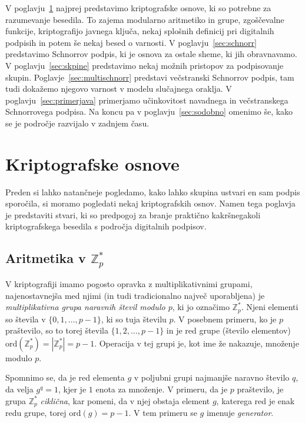 \documentclass[isrm2, tisk]{fmfdelo}
\newcommand{\Z}{\mathbb Z}
\begin{document}
V poglavju~\ref{sec:osnove} najprej predstavimo kriptografske osnove, ki so potrebne za razumevanje besedila.
To zajema modularno aritmetiko in grupe, zgoščevalne funkcije, kriptografijo javnega ključa, nekaj
splošnih definicij pri digitalnih podpisih in potem še nekaj besed o varnosti. V poglavju~\ref{sec:schnorr}
predstavimo Schnorrov podpis, ki je osnova za ostale sheme, ki jih obravnavamo. V 
poglavju~\ref{sec:skpine} predstavimo nekaj možnih pristopov za podpisovanje skupin. Poglavje~\ref{sec:multischnorr}
predstavi večstranski Schnorrov podpis, tam tudi dokažemo njegovo varnost v modelu slučajnega oraklja.
V poglavju~\ref{sec:primerjava} primerjamo učinkovitost navadnega in večstranskega Schnorrovega podpisa.
Na koncu pa v poglavju~\ref{sec:sodobno} omenimo še, kako se je področje razvijalo v zadnjem času.

\section{Kriptografske osnove}
\label{sec:osnove}
Preden si lahko natančneje pogledamo, kako lahko skupina ustvari en sam podpis sporočila, si moramo 
pogledati nekaj kriptografskih osnov. Namen tega poglavja je predstaviti stvari, ki so predpogoj za
branje praktično kakršnegakoli kriptografskega besedila s področja digitalnih podpisov.

\subsection{Aritmetika v \texorpdfstring{$\Z_p^*$}{Zp∗}}
V kriptografiji imamo pogosto opravka z multiplikativnimi grupami, najenostavnejša med njimi (in
tudi tradicionalno največ uporabljena) je \textit{multiplikativna grupa naravnih števil modulo $p$},
ki jo označimo $\Z_p^*$. Njeni elementi so števila v $\{0, 1, \dots, p - 1\}$, ki so tuja številu $p$.
V posebnem primeru, ko je $p$ praštevilo, so to torej števila $\{1, 2, \dots, p - 1\}$ in je red grupe
(število elementov) $\text{ord}(\Z_p^*) = |\Z_p^*| = p - 1$. Operacija v tej grupi je, kot ime že
nakazuje, množenje modulo $p$.

Spomnimo se, da je red elementa $g$ v poljubni grupi najmanjše naravno število $q$, da velja $g^q = 1$,
kjer je $1$ enota za množenje. V primeru, da je $p$ praštevilo, je grupa $\Z_p^*$ \textit{ciklična},
kar pomeni, da v njej obstaja element $g$, katerega red je enak redu grupe, torej $\text{ord}(g) = p - 1$.
V tem primeru se $g$ imenuje \textit{generator}.
\end{document}
